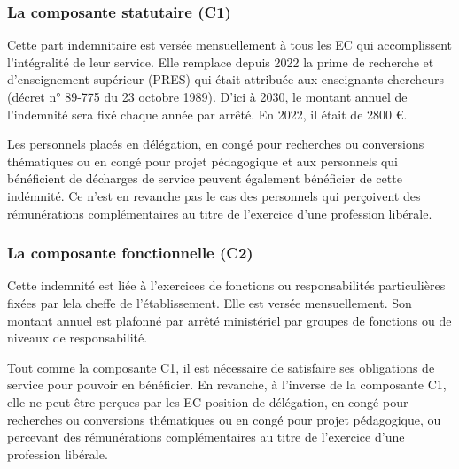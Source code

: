 \subsubsection{La composante statutaire (C1)}
\label{ripec-C1}

Cette part indemnitaire est vers\'ee mensuellement \`a tous les EC qui accomplissent l'int\'egralit\'e de leur service. Elle remplace depuis 2022 la prime de recherche et d'enseignement sup\'erieur (PRES) qui \'etait attribu\'ee aux enseignants-chercheurs (d\'ecret n° 89-775 du 23 octobre 1989). D'ici \`a 2030, le montant annuel de l'indemnit\'e sera fix\'e chaque ann\'ee par arr\^et\'e. En 2022, il \'etait de 2800 \euro.

Les personnels plac\'es en d\'el\'egation, en cong\'e pour recherches ou conversions th\'ematiques ou en cong\'e pour projet p\'edagogique et aux personnels qui b\'en\'eficient de d\'echarges de service peuvent \'egalement b\'en\'eficier de cette ind\'emnit\'e. Ce n'est en revanche pas le cas des personnels qui perçoivent des r\'emun\'erations compl\'ementaires au titre de l'exercice d'une profession lib\'erale.

%

\subsubsection{La composante fonctionnelle (C2)}

Cette indemnit\'e est li\'ee \`a l'exercices de fonctions ou responsabilit\'es particuli\`eres fix\'ees par le\mp la chef\mp fe de l'\'etablissement. Elle est vers\'ee mensuellement. Son montant annuel est plafonn\'e par arr\^et\'e minist\'eriel par groupes de fonctions ou de niveaux de responsabilit\'e. 

Tout comme la composante C1, il est n\'ecessaire de satisfaire ses obligations de service pour pouvoir en b\'en\'eficier. En revanche, \`a l'inverse de la composante C1, elle ne peut \^etre per\c{c}ues par les EC position de d\'el\'egation, en cong\'e pour recherches ou conversions th\'ematiques ou en cong\'e pour projet p\'edagogique, ou percevant des r\'emun\'erations compl\'ementaires au titre de l'exercice d'une profession lib\'erale.

